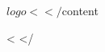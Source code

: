\documentclass[a4paper,10pt]{article}
\begin{document}
  ${logo}

<%
</%

${content}

<%
</%
\end{document}
